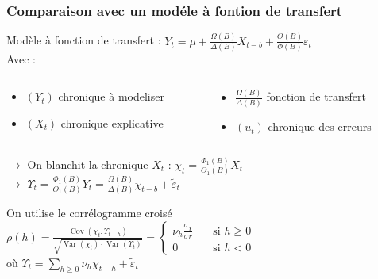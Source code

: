 \documentclass{presentation_template}
\begin{document}
\begin{frame}
  \frametitle{Comparaison avec un modéle à fontion de transfert}
  Modèle à fonction de transfert : $Y_{t}=\mu+\frac{\Omega(B)}{\Delta(B)} X_{t-b}+\frac{\Theta(B)}{\Phi(B)} \varepsilon_{t}$ \\
  Avec :
  \begin{columns}
    \begin{column}{0.5\textwidth}
      \begin{itemize}
        \item $(Y_t)$ chronique à modeliser
        \item $(X_t)$ chronique explicative
        
      \end{itemize}
    \end{column}
    \begin{column}{0.5\textwidth}
      \begin{itemize}
        \item $\frac{\Omega(B)}{\Delta(B)}$ fonction de transfert
        \item $(u_t)$ chronique des erreurs
      \end{itemize}
    \end{column}
  \end{columns}
  \vspace{0.2cm}
  $\rightarrow$ On blanchit la chronique $X_t$ : $\chi_{t}=\frac{\Phi_{1}(B)}{\Theta_{1}(B)} X_{t}$ \\
  \vspace{0.2cm}
  $\rightarrow$ $\Upsilon_{t}=\frac{\Phi_{1}(B)}{\Theta_{1}(B)} Y_{t}=\frac{\Omega(B)}{\Delta(B)} \chi_{t-b}+\widetilde{\varepsilon}_{t}$

  On utilise le corrélogramme croisé $\rho(h)=\frac{\operatorname{Cov}\left(\chi_{t}, 
  \Upsilon_{t+h}\right)}{\sqrt{\operatorname{Var}\left(\chi_{t}\right) \cdot \operatorname{Var}\left(\Upsilon_{t}\right)}}
  = \left\{ \begin{aligned}
    \nu_{h} \frac{\sigma_{\chi}}{\sigma r} \quad &\text{si } h \geqslant 0 \\
    0 \quad &\text{si } h < 0
  \end{aligned}\right.$ \\
  où $\Upsilon_{t}=\sum_{h \geqslant 0} \nu_{h} \chi_{t-h}+\widetilde{\varepsilon}_{t}$
\end{frame}
\end{document}
